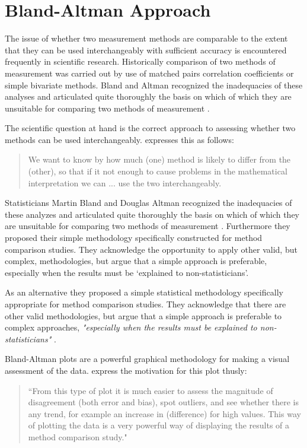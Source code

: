 \documentclass[Main.tex]{subfiles}
\begin{document}
	\section{Bland-Altman Approach}

The issue of whether two measurement methods are comparable to the extent that they can be used interchangeably with sufficient accuracy is encountered frequently in scientific research. Historically comparison of two methods of measurement was carried
out by use of matched pairs correlation coefficients or simple bivariate methods. Bland and Altman recognized the inadequacies of these analyses and articulated quite thoroughly the basis on which of which they are unsuitable for comparing two methods of measurement \citep*{BA83}.
	


The scientific question at hand is the correct approach to
assessing whether two methods can be used interchangeably.
\citet{BA99} expresses this as follows:
\begin{quote}We want to
	know by how much (one) method is likely to differ from the
	(other), so that if it not enough to cause problems in the
	mathematical interpretation we can ... use the two
	interchangeably.
\end{quote}


Statisticians Martin Bland and Douglas Altman recognized the inadequacies of these analyzes and
articulated quite thoroughly the basis on which of which they are unsuitable for comparing two methods of measurement \citep*{BA83}. Furthermore they proposed their simple methodology specifically constructed for method comparison studies. They acknowledge the opportunity to apply other valid, but complex, methodologies, but argue that a simple approach is preferable, especially when the results must be `explained to non-statisticians'.

As an alternative they proposed a simple statistical methodology specifically appropriate for method comparison studies. They acknowledge that there are other valid methodologies, but argue that a simple approach is preferable to complex approaches,	\emph{"especially when the results must be explained to non-statisticians"} \citep*{BA83}.

	Bland-Altman plots are a powerful graphical methodology for making
	a visual assessment of the data. \citet*{BA83} express the
	motivation for this plot thusly:
	\begin{quote}
		``From this type of plot it is much easier to assess the magnitude
		of disagreement (both error and bias), spot outliers, and see
		whether there is any trend, for example an increase in
		(difference) for high values. This way of plotting the data is a
		very powerful way of displaying the results of a method comparison
		study."
	\end{quote}
	
\end{document}
